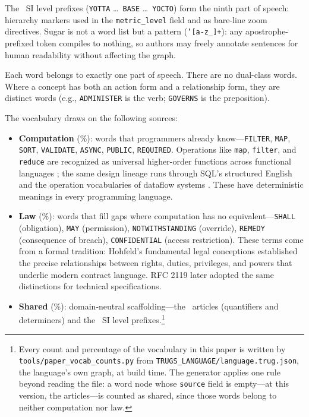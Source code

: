 \documentclass{article}
\begin{document}
The \VocabLevelPrefixes\ SI level prefixes (\texttt{YOTTA} \ldots\ \texttt{BASE} \ldots\ \texttt{YOCTO}) form the ninth part of speech: hierarchy markers used in the \texttt{metric\_level} field and as bare-line zoom directives. Sugar is not a word list but a pattern (\texttt{'[a-z\_]+}): any apostrophe-prefixed token compiles to nothing, so authors may freely annotate sentences for human readability without affecting the graph.

Each word belongs to exactly one part of speech. There are no dual-class words. Where a concept has both an action form and a relationship form, they are distinct words (e.g., \texttt{ADMINISTER} is the verb; \texttt{GOVERNS} is the preposition).

The vocabulary draws on the following sources:

\begin{itemize}
    \item \textbf{Computation} (\VocabComputationPct\%): words that programmers already know---\texttt{FILTER}, \texttt{MAP}, \texttt{SORT}, \texttt{VALIDATE}, \texttt{ASYNC}, \texttt{PUBLIC}, \texttt{REQUIRED}. Operations like \texttt{map}, \texttt{filter}, and \texttt{reduce} are recognized as universal higher-order functions across functional languages \citep{hutton2016programming}; the same design lineage runs through SQL's structured English \citep{chamberlin1974sequel} and the operation vocabularies of dataflow systems \citep{dennis1975preliminary, abadi2016tensorflow}. These have deterministic meanings in every programming language.

    \item \textbf{Law} (\VocabLawPct\%): words that fill gaps where computation has no equivalent---\texttt{SHALL} (obligation), \texttt{MAY} (permission), \texttt{NOTWITHSTANDING} (override), \texttt{REMEDY} (consequence of breach), \texttt{CONFIDENTIAL} (access restriction). These terms come from a formal tradition: Hohfeld's fundamental legal conceptions \citep{hohfeld1919fundamental} established the precise relationships between rights, duties, privileges, and powers that underlie modern contract language. RFC 2119 \citep{rfc2119} later adopted the same distinctions for technical specifications.

    \item \textbf{Shared} (\VocabSharedPct\%): domain-neutral scaffolding---the \VocabArticles\ articles (quantifiers and determiners) and the \VocabLevelPrefixes\ SI level prefixes.\footnote{Every count and percentage of the vocabulary in this paper is written by \texttt{tools/paper\_vocab\_counts.py} from \texttt{TRUGS\_LANGUAGE/language.trug.json}, the language's own graph, at build time. The generator applies one rule beyond reading the file: a word node whose \texttt{source} field is empty---at this version, the articles---is counted as shared, since those words belong to neither computation nor law.}
\end{itemize}
\end{document}
